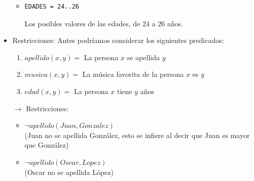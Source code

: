 \documentclass[12pt]{article}
\begin{document}
\begin{itemize}
\begin{itemize}
\item \begin{verbatim}
EDADES = 24..26
\end{verbatim}
Los posibles valores de las edades, de 24 a 26 años.
\end{itemize}
\item Restricciones:
Antes podríamos considerar los siguientes predicados:
\begin{enumerate}
\item $apellido(x,y) = $ La persona $x$ se apellida $y$
\item $musica(x,y) = $ La música favorita de la persona $x$ es $y$
\item $edad(x,y) = $ La persona $x$ tiene $y$ años
\end{enumerate}
$\rightarrow$ Restricciones:
\begin{itemize}
\item $\neg apellido(Juan, Gonzalez)$ \\ (Juan no se apellida González, esto se infiere al decir que Juan es mayor que González)
\item $\neg apellido(Oscar, Lopez)$ \\ (Oscar no se apellida López)
\end{itemize}
\end{itemize}
\end{document}
